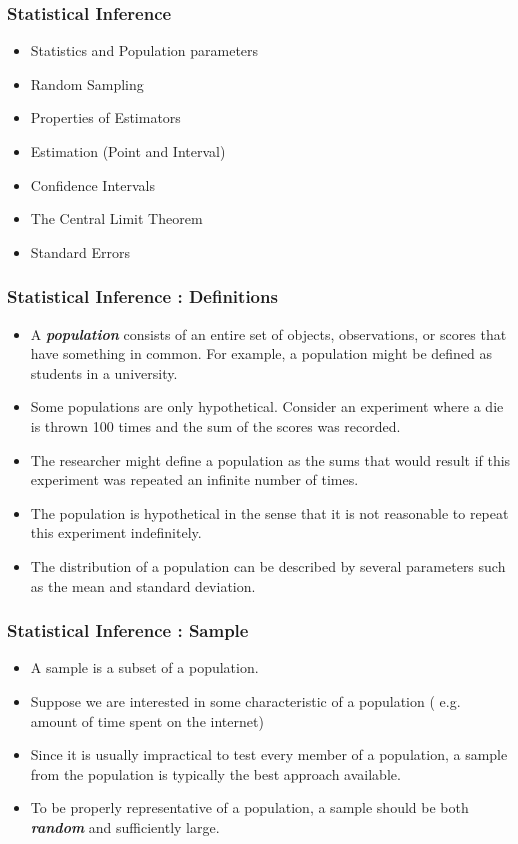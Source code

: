 
\begin{frame}
\frametitle{Statistical Inference}

\begin{itemize}
\item Statistics and Population parameters
\item Random Sampling
\item Properties of Estimators
\item Estimation (Point and Interval)
\item Confidence Intervals
\item The Central Limit Theorem
\item Standard Errors
\end{itemize}


\end{frame}




\begin{frame}
\frametitle{Statistical Inference : Definitions}
\begin{itemize}
\item A \textbf{\emph{population}} consists of an entire set of objects, observations, or scores that have something in common.
For example, a population might be defined as students in a university.

\item Some populations are only hypothetical. Consider an experiment where a die is thrown 100 times and the sum of the scores was recorded.
\item The researcher might define a population as the sums that would result if this experiment was repeated an infinite number of times.
\item The population is hypothetical in the sense that it is not reasonable to repeat this experiment indefinitely.
\item The distribution of a population can be described by several parameters such as the mean and standard deviation.

\end{itemize}
\end{frame}
\begin{frame}
\frametitle{Statistical Inference : Sample}
\begin{itemize}

\item A sample is a subset of a population.
\item Suppose we are interested in some characteristic of a population ( e.g. amount of time spent on the internet)
\item Since it is usually impractical to test every member of a population, a sample from the population is typically
the best approach available.
\item To be properly representative of a population, a sample should be both \textbf{\emph{ random}} and sufficiently large.


\end{itemize}
\end{frame}



